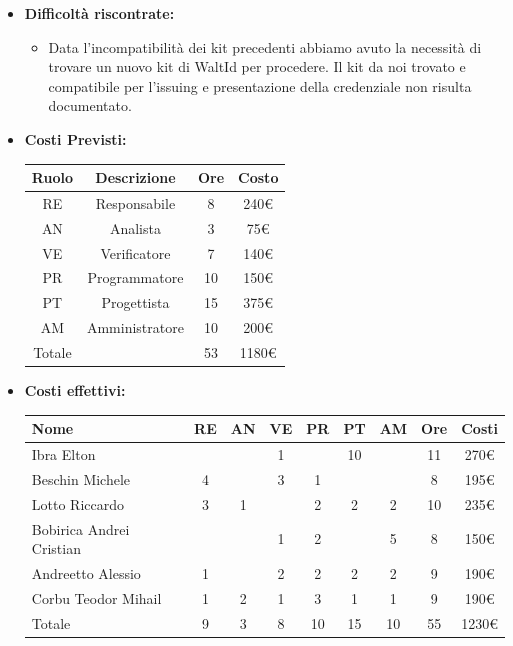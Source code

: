 \begin{itemize}
\begin{itemize}
                
            \end{itemize}
            \item \textbf{Difficoltà riscontrate:}
             \begin{itemize}
                \item  Data l'incompatibilità dei kit precedenti abbiamo avuto la necessità di trovare un nuovo kit di WaltId per procedere. Il kit da noi trovato e compatibile per l'issuing e presentazione della credenziale non risulta documentato.
             \end{itemize}
            \item \textbf{Costi Previsti:}
            \begin{longtable}{|c|c|c|c|}
                \hline
                Ruolo & Descrizione & Ore & Costo \\
                \hline
                RE & Responsabile & 8 &  240€\\
                \hline
                AN & Analista & 3 &  75€\\
                \hline
                VE & Verificatore & 7 & 140€ \\
                \hline
                PR & Programmatore & 10 &  150€\\
                \hline
                PT & Progettista & 15 &  375€\\
                \hline
                AM & Amministratore & 10 &  200€\\
                \hline
                Totale & &  53 &  1180€\\
                \hline
                \end{longtable}
            \item \textbf{Costi effettivi:}
            \begin{longtable}{|p{}|c|c|c|c|c|c|c|c|}
                \hline
                Nome & RE & AN & VE & PR & PT & AM & Ore & Costi\\
                \hline
                Ibra \newline Elton & & &1 & &10 & &11 &270€ \\
                \hline
                Beschin Michele & 4& & 3& 1& & & 8& 195€ \\
                \hline
                Lotto \newline Riccardo & 3& 1& & 2& 2& 2& 10& 235€\\
                \hline
                Bobirica Andrei Cristian & & &1 &2 & &5 &8 &150€ \\
                \hline
                Andreetto Alessio & 1& & 2& 2& 2& 2& 9& 190€\\
                \hline
                Corbu Teodor Mihail & 1& 2& 1& 3& 1& 1& 9& 190€\\
                \hline
                Totale &9 &3 &8 &10 &15 &10 &55 &1230€ \\
                \hline
            \end{longtable}
            \end{itemize}


